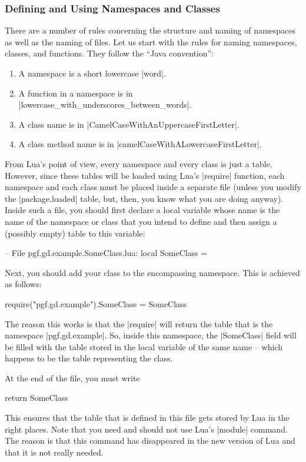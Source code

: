 \subsubsection{Defining and Using Namespaces and Classes}

There are a number of rules concerning the structure and naming of
namespaces as well as the naming of files. Let us start with the
rules for naming namespaces, classes, and functions. They follow the
``Java convention'':

\begin{enumerate}
\item A namespace is a short lowercase |word|.
\item A function in a namespace is in |lowercase_with_underscores_between_words|.
\item A class name is in |CamelCaseWithAnUppercaseFirstLetter|.
\item A class method name is in |camelCaseWithALowercaseFirstLetter|.
\end{enumerate}

From Lua's point of view, every namespace and every class is just a
table. However, since these tables will be loaded using Lua's
|require| function, each namespace and each class must be placed
inside a separate file (unless you modify the |package.loaded| table,
but, then, you know what you are doing anyway). Inside such a file, you
should first declare a local variable whose name is the name of the
namespace or class that you intend to define and then assign a
(possibly empty) table to this variable:
\begin{codeexample}
-- File pgf.gd.example.SomeClass.lua:
local SomeClass = {}
\end{codeexample}
Next, you should add your class to the encompassing namespace. This is
achieved as follows:
\begin{codeexample}
require("pgf.gd.example").SomeClass = SomeClass
\end{codeexample}
The reason this works is that the |require| will return the table that
is the namespace |pgf.gd.example|. So, inside this namespace, the
|SomeClass| field will be filled with the table stored in the local
variable of the same name -- which happens to be the table
representing the class.

At the end of the file, you must write
\begin{codeexample}
return SomeClass  
\end{codeexample}
This ensures that the table that is defined in this file gets stored
by Lua in the right places. Note that you need and should not use
Lua's |module| command. The reason is that this command has
disappeared in the new version of Lua and that it is not really
needed. 

